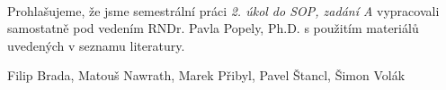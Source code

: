 \documentclass[../bakalarka-main.tex]{subfiles}
\begin{document}
	\newpage
	\thispagestyle{empty}
	
	\
	
	\vspace{15cm}\noindent Prohlašujeme, že jsme semestrální práci {\it
		2. úkol do SOP, zadání A} vypracovali samostatně pod
	vedením RNDr. Pavla Popely, Ph.D. s použitím materiálů uvedených
	v seznamu literatury.
	
	\vspace{1cm}
	\hfill{Filip Brada, Matouš Nawrath, Marek Přibyl, Pavel Štancl, Šimon Volák}
	
	\newpage
	\thispagestyle{empty}
	\
\end{document}
